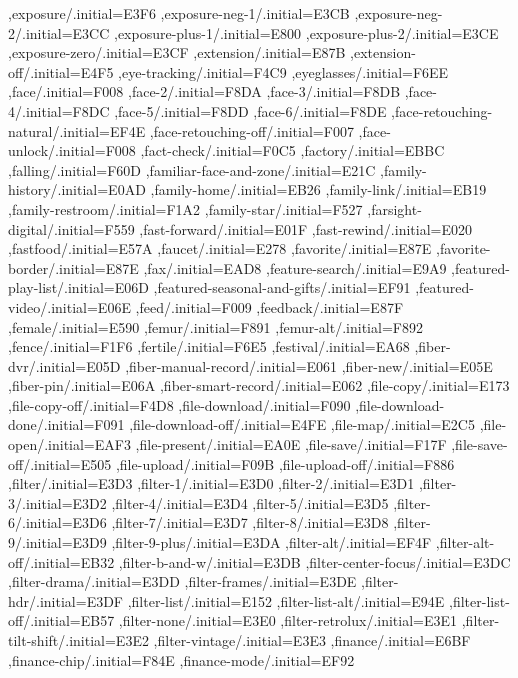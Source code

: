 { ,exposure/.initial=E3F6
 ,exposure-neg-1/.initial=E3CB
 ,exposure-neg-2/.initial=E3CC
 ,exposure-plus-1/.initial=E800
 ,exposure-plus-2/.initial=E3CE
 ,exposure-zero/.initial=E3CF
 ,extension/.initial=E87B
 ,extension-off/.initial=E4F5
 ,eye-tracking/.initial=F4C9
 ,eyeglasses/.initial=F6EE
 ,face/.initial=F008
 ,face-2/.initial=F8DA
 ,face-3/.initial=F8DB
 ,face-4/.initial=F8DC
 ,face-5/.initial=F8DD
 ,face-6/.initial=F8DE
 ,face-retouching-natural/.initial=EF4E
 ,face-retouching-off/.initial=F007
 ,face-unlock/.initial=F008
 ,fact-check/.initial=F0C5
 ,factory/.initial=EBBC
 ,falling/.initial=F60D
 ,familiar-face-and-zone/.initial=E21C
 ,family-history/.initial=E0AD
 ,family-home/.initial=EB26
 ,family-link/.initial=EB19
 ,family-restroom/.initial=F1A2
 ,family-star/.initial=F527
 ,farsight-digital/.initial=F559
 ,fast-forward/.initial=E01F
 ,fast-rewind/.initial=E020
 ,fastfood/.initial=E57A
 ,faucet/.initial=E278
 ,favorite/.initial=E87E
 ,favorite-border/.initial=E87E
 ,fax/.initial=EAD8
 ,feature-search/.initial=E9A9
 ,featured-play-list/.initial=E06D
 ,featured-seasonal-and-gifts/.initial=EF91
 ,featured-video/.initial=E06E
 ,feed/.initial=F009
 ,feedback/.initial=E87F
 ,female/.initial=E590
 ,femur/.initial=F891
 ,femur-alt/.initial=F892
 ,fence/.initial=F1F6
 ,fertile/.initial=F6E5
 ,festival/.initial=EA68
 ,fiber-dvr/.initial=E05D
 ,fiber-manual-record/.initial=E061
 ,fiber-new/.initial=E05E
 ,fiber-pin/.initial=E06A
 ,fiber-smart-record/.initial=E062
 ,file-copy/.initial=E173
 ,file-copy-off/.initial=F4D8
 ,file-download/.initial=F090
 ,file-download-done/.initial=F091
 ,file-download-off/.initial=E4FE
 ,file-map/.initial=E2C5
 ,file-open/.initial=EAF3
 ,file-present/.initial=EA0E
 ,file-save/.initial=F17F
 ,file-save-off/.initial=E505
 ,file-upload/.initial=F09B
 ,file-upload-off/.initial=F886
 ,filter/.initial=E3D3
 ,filter-1/.initial=E3D0
 ,filter-2/.initial=E3D1
 ,filter-3/.initial=E3D2
 ,filter-4/.initial=E3D4
 ,filter-5/.initial=E3D5
 ,filter-6/.initial=E3D6
 ,filter-7/.initial=E3D7
 ,filter-8/.initial=E3D8
 ,filter-9/.initial=E3D9
 ,filter-9-plus/.initial=E3DA
 ,filter-alt/.initial=EF4F
 ,filter-alt-off/.initial=EB32
 ,filter-b-and-w/.initial=E3DB
 ,filter-center-focus/.initial=E3DC
 ,filter-drama/.initial=E3DD
 ,filter-frames/.initial=E3DE
 ,filter-hdr/.initial=E3DF
 ,filter-list/.initial=E152
 ,filter-list-alt/.initial=E94E
 ,filter-list-off/.initial=EB57
 ,filter-none/.initial=E3E0
 ,filter-retrolux/.initial=E3E1
 ,filter-tilt-shift/.initial=E3E2
 ,filter-vintage/.initial=E3E3
 ,finance/.initial=E6BF
 ,finance-chip/.initial=F84E
 ,finance-mode/.initial=EF92
}
